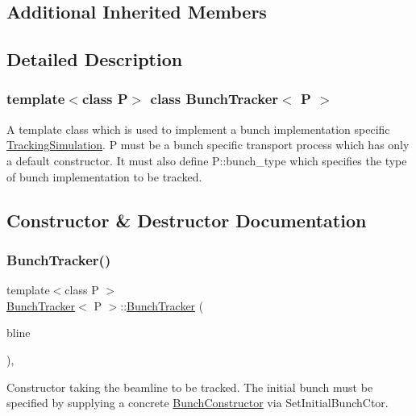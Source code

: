 \subsection*{Additional Inherited Members}


\subsection{Detailed Description}
\subsubsection*{template$<$class P$>$\newline
class Bunch\+Tracker$<$ P $>$}

A template class which is used to implement a bunch implementation specific \hyperlink{classTrackingSimulation}{Tracking\+Simulation}. P must be a bunch specific transport process which has only a default constructor. It must also define P\+::bunch\+\_\+type which specifies the type of bunch implementation to be tracked. 

\subsection{Constructor \& Destructor Documentation}
\mbox{\label{classBunchTracker_a724b0e1b99f6b86e8ba7922461548e18}} 
\subsubsection{\texorpdfstring{Bunch\+Tracker()}{BunchTracker()}\hspace{0.1cm}{\footnotesize\ttfamily [1/2]}}
{\footnotesize\ttfamily template$<$class P $>$ \\
\hyperlink{classBunchTracker}{Bunch\+Tracker}$<$ P $>$\+::\hyperlink{classBunchTracker}{Bunch\+Tracker} (\begin{DoxyParamCaption}\item[{const \hyperlink{classAcceleratorModel_1_1Beamline}{Accelerator\+Model\+::\+Beamline} \&}]{bline }\end{DoxyParamCaption})\hspace{0.3cm}{\ttfamily [inline]}, {\ttfamily [explicit]}}

Constructor taking the beamline to be tracked. The initial bunch must be specified by supplying a concrete \hyperlink{classBunchConstructor}{Bunch\+Constructor} via Set\+Initial\+Bunch\+Ctor. \mbox{\label{classBunchTracker_aac4546a7a80bd46d2e428836202e3bad}} 
